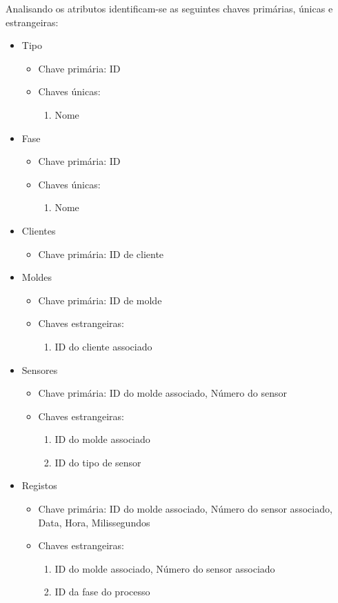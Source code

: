 \documentclass[11pt,twoside,a4paper]{report}
\begin{document}
Analisando os atributos identificam-se as seguintes chaves primárias, únicas e estrangeiras:
\begin{itemize}[noitemsep]
	\item Tipo
	\begin{itemize}[noitemsep]
		\item Chave primária: ID
		\item Chaves únicas:
		\begin{enumerate}
			\item Nome
		\end{enumerate}
	\end{itemize}
	\item Fase
	\begin{itemize}[noitemsep]
		\item Chave primária: ID
		\item Chaves únicas:
		\begin{enumerate}
			\item Nome
		\end{enumerate}
	\end{itemize}
	\item Clientes
	\begin{itemize}[noitemsep]
		\item Chave primária: ID de cliente
	\end{itemize}
	\item Moldes
	\begin{itemize}[noitemsep]
		\item Chave primária: ID de molde
		\item Chaves estrangeiras:
		\begin{enumerate}
			\item ID do cliente associado
		\end{enumerate}
	\end{itemize}
	\item Sensores
	\begin{itemize}[noitemsep]
		\item Chave primária: ID do molde associado, Número do sensor
		\item Chaves estrangeiras:
		\begin{enumerate}
			\item ID do molde associado
			\item ID do tipo de sensor
		\end{enumerate}
	\end{itemize}
	\item Registos
	\begin{itemize}[noitemsep]
		\item Chave primária: ID do molde associado, Número do sensor associado, Data, Hora, Milissegundos
		\item Chaves estrangeiras:
		\begin{enumerate}
			\item ID do molde associado, Número do sensor associado
			\item ID da fase do processo
		\end{enumerate}
	\end{itemize}
\end{itemize}
\end{document}
